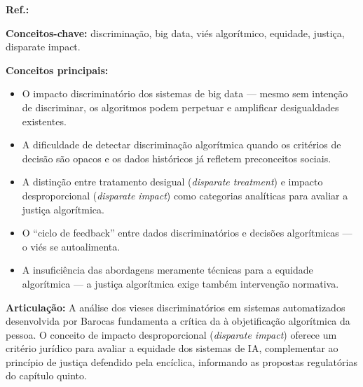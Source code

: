 \begin{fichamento}
    \textbf{Ref.:} \cite{Barocas2016BFF}
    
    \textbf{Conceitos-chave:} discriminação, big data, viés algorítmico, equidade, justiça, disparate impact.
    
    \textbf{Conceitos principais:}
    \begin{itemize}
        \item O impacto discriminatório dos sistemas de big data — mesmo sem intenção de discriminar, os algoritmos podem perpetuar e amplificar desigualdades existentes.
        \item A dificuldade de detectar discriminação algorítmica quando os critérios de decisão são opacos e os dados históricos já refletem preconceitos sociais.
        \item A distinção entre tratamento desigual (\textit{disparate treatment}) e impacto desproporcional (\textit{disparate impact}) como categorias analíticas para avaliar a justiça algorítmica.
        \item O ``ciclo de feedback'' entre dados discriminatórios e decisões algorítmicas — o viés se autoalimenta.
        \item A insuficiência das abordagens meramente técnicas para a equidade algorítmica — a justiça algorítmica exige também intervenção normativa.
    \end{itemize}
    
    \textbf{Articulação:} A análise dos vieses discriminatórios em sistemas automatizados desenvolvida por Barocas fundamenta a crítica da \MH{} à objetificação algorítmica da pessoa. O conceito de impacto desproporcional (\textit{disparate impact}) oferece um critério jurídico para avaliar a equidade dos sistemas de IA, complementar ao princípio de justiça defendido pela encíclica, informando as propostas regulatórias do capítulo quinto.
\end{fichamento}

